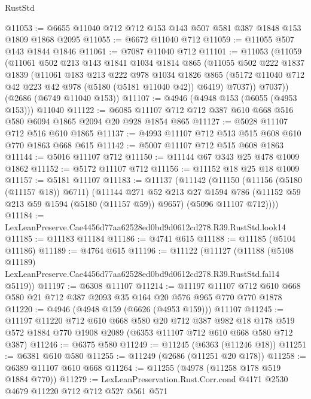 \begin{lexlean}{RustStd}
\begin{coremodule}
@11053 := @6655 @11040 @712 @712 @153 @143 @507 @581 @387 @1848 @153 @1809 @1868 @2095
@11055 := @6672 @11040 @712
@11059 := @11055 @507 @143 @1844 @1846
@11061 := @7087 @11040 @712
@11101 := @11053
    (@11059
      (@11061
        @502
        @213
        @143
        @1841
        @1034
        @1814
        @865
        (@11055
          @502
          @222
          @1837
          @1839
          (@11061
            @183
            @213
            @222
            @978
            @1034
            @1826
            @865
            (@5172 @11040 @712 @42 @223 @42 @978 (@5180 (@5181 @11040 @42)) @6419)
            @7037))
        @7037))
    (@2686 (@6749 @11040 @153))
@11107 := @4946 (@4948 @153 (@6055 (@4953 @153))) @11040
@11122 := @6085 @11107 @712 @712 @387 @610 @668 @516 @580 @6094 @1865 @2094 @20 @928 @1854 @865
@11127 := @5028 @11107 @712 @516 @610 @1865
@11137 := @4993 @11107 @712 @513 @515 @608 @610 @770 @1863 @668 @615
@11142 := @5007 @11107 @712 @515 @608 @1863
@11144 := @5016 @11107 @712
@11150 := @11144 @67 @343 @25 @478 @1009 @1862
@11152 := @5172 @11107 @712
@11156 := @11152 @18 @25 @18 @1009
@11157 := @5181 @11107
@11183 := @11137
    (@11142
      (@11150
        (@11156 (@5180 (@11157 @18)) @6711)
        (@11144
          @271
          @52
          @213
          @27
          @1594
          @786
          (@11152 @59 @213 @59 @1594 (@5180 (@11157 @59)) @9657)
          (@5096 @11107 @712))))
@11184 := LexLeanPreserve.Cae4456d77aa62528ed0bd9d0612cd278.R39.RustStd.look14
@11185 := @11183 @11184
@11186 := @4741 @615
@11188 := @11185 (@5104 @11186)
@11189 := @4764 @615
@11196 := @11122
    (@11127
      (@11188
        (@5108 @11189)
        LexLeanPreserve.Cae4456d77aa62528ed0bd9d0612cd278.R39.RustStd.fal14
        @5119))
@11197 := @6308 @11107
@11214 := @11197
    @11107
    @712
    @610
    @668
    @580
    @21
    @712
    @387
    @2093
    @35
    @164
    @20
    @576
    @965
    @770
    @770
    @1878
@11220 := @4946 (@4948 @159 (@6626 (@4953 @159))) @11107
@11245 := @11197
    @11220
    @712
    @610
    @668
    @580
    @20
    @712
    @387
    @982
    @18
    @178
    @519
    @572
    @1884
    @770
    @1908
    @2089
    (@6353 @11107 @712 @610 @668 @580 @712 @387)
@11246 := @6375 @580
@11249 := @11245 (@6363 (@11246 @18))
@11251 := @6381 @610 @580
@11255 := @11249 (@2686 (@11251 @20 @178))
@11258 := @6389 @11107 @610 @668
@11264 := @11255 (@4978 (@11258 @178 @519 @1884 @770))
@11279 := LexLeanPreservation.Rust.Corr.cond
    @4171
    @2530
    @4679
    @11220
    @712
    @712
    @527
    @561
    @571

\end{coremodule}
\end{lexlean}
